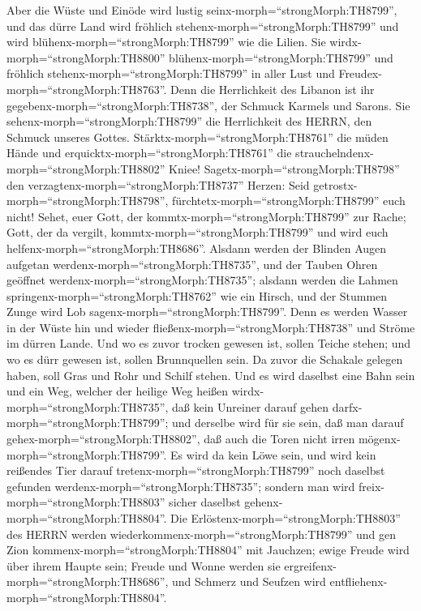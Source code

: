  Aber die Wüste und Einöde wird lustig
seinx-morph=``strongMorph:TH8799'', und das dürre Land wird fröhlich
stehenx-morph=``strongMorph:TH8799'' und wird
blühenx-morph=``strongMorph:TH8799'' wie die Lilien.  Sie
wirdx-morph=``strongMorph:TH8800'' blühenx-morph=``strongMorph:TH8799''
und fröhlich stehenx-morph=``strongMorph:TH8799'' in aller Lust und
Freudex-morph=``strongMorph:TH8763''. Denn die Herrlichkeit des Libanon
ist ihr gegebenx-morph=``strongMorph:TH8738'', der Schmuck Karmels und
Sarons. Sie sehenx-morph=``strongMorph:TH8799'' die Herrlichkeit des
HERRN, den Schmuck unseres Gottes. 
Stärktx-morph=``strongMorph:TH8761'' die müden Hände und
erquicktx-morph=``strongMorph:TH8761'' die
strauchelndenx-morph=``strongMorph:TH8802'' Kniee! 
Sagetx-morph=``strongMorph:TH8798'' den
verzagtenx-morph=``strongMorph:TH8737'' Herzen: Seid
getrostx-morph=``strongMorph:TH8798'',
fürchtetx-morph=``strongMorph:TH8799'' euch nicht! Sehet, euer Gott, der
kommtx-morph=``strongMorph:TH8799'' zur Rache; Gott, der da vergilt,
kommtx-morph=``strongMorph:TH8799'' und wird euch
helfenx-morph=``strongMorph:TH8686''.  Alsdann werden der
Blinden Augen aufgetan werdenx-morph=``strongMorph:TH8735'', und der
Tauben Ohren geöffnet werdenx-morph=``strongMorph:TH8735''; 
alsdann werden die Lahmen springenx-morph=``strongMorph:TH8762'' wie ein
Hirsch, und der Stummen Zunge wird Lob
sagenx-morph=``strongMorph:TH8799''. Denn es werden Wasser in der Wüste
hin und wieder fließenx-morph=``strongMorph:TH8738'' und Ströme im
dürren Lande.  Und wo es zuvor trocken gewesen ist, sollen
Teiche stehen; und wo es dürr gewesen ist, sollen Brunnquellen sein. Da
zuvor die Schakale gelegen haben, soll Gras und Rohr und Schilf stehen.
 Und es wird daselbst eine Bahn sein und ein Weg, welcher
der heilige Weg heißen wirdx-morph=``strongMorph:TH8735'', daß kein
Unreiner darauf gehen darfx-morph=``strongMorph:TH8799''; und derselbe
wird für sie sein, daß man darauf gehex-morph=``strongMorph:TH8802'',
daß auch die Toren nicht irren mögenx-morph=``strongMorph:TH8799''.
 Es wird da kein Löwe sein, und wird kein reißendes Tier
darauf tretenx-morph=``strongMorph:TH8799'' noch daselbst gefunden
werdenx-morph=``strongMorph:TH8735''; sondern man wird
freix-morph=``strongMorph:TH8803'' sicher daselbst
gehenx-morph=``strongMorph:TH8804''.  Die
Erlöstenx-morph=``strongMorph:TH8803'' des HERRN werden
wiederkommenx-morph=``strongMorph:TH8799'' und gen Zion
kommenx-morph=``strongMorph:TH8804'' mit Jauchzen; ewige Freude wird
über ihrem Haupte sein; Freude und Wonne werden sie
ergreifenx-morph=``strongMorph:TH8686'', und Schmerz und Seufzen wird
entfliehenx-morph=``strongMorph:TH8804''.


